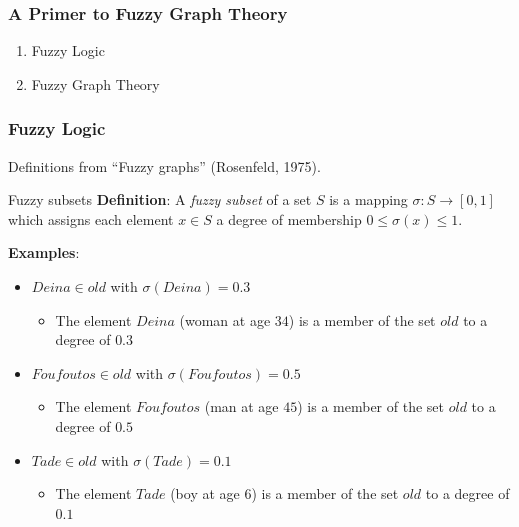 



\begin{frame}
	\frametitle{A Primer to Fuzzy Graph Theory}

	\begin{enumerate}
		\item Fuzzy Logic
		\item Fuzzy Graph Theory
	\end{enumerate}
\end{frame}

\begin{frame}
	\frametitle{Fuzzy Logic}

	Definitions from ``Fuzzy graphs'' {\footnotesize (Rosenfeld, 1975)}.

	\begin{block}{Fuzzy subsets}
		\textbf{Definition}: A \textit{fuzzy subset} of a set $S$ is a mapping $\sigma: S \rightarrow [0, 1]$ which assigns each element $x \in S$ a degree of membership $0 \le \sigma(x) \le 1$.

		\vspace*{2em}

		\textbf{Examples}:
		\begin{itemize}
			\item $Deina \in old$ with $\sigma(Deina) = 0.3$
			\begin{itemize}
				\item The element $Deina$ (woman at age $34$) is a member of the set $old$ to a degree of $0.3$
			\end{itemize}
			\item $Foufoutos \in old$ with $\sigma(Foufoutos) = 0.5$
			\begin{itemize}
				\item The element $Foufoutos$ (man at age $45$) is a member of the set $old$ to a degree of $0.5$
			\end{itemize}
			\item $Tade \in old$ with $\sigma(Tade) = 0.1$
			\begin{itemize}
				\item The element $Tade$ (boy at age $6$) is a member of the set $old$ to a degree of $0.1$
			\end{itemize}
		\end{itemize}
	\end{block}
\end{frame}

